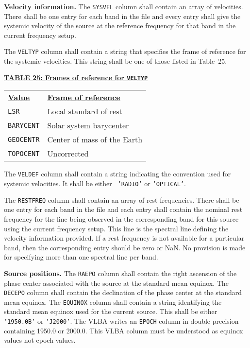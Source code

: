 \documentclass[twoside]{article}
\newcommand{\Hi}[1]{\textcolor{hicol}{#1}}
\newcommand{\Me}[1]{\textcolor{mecol}{#1}}
\begin{document}
{\bf Velocity information.}  The {\tt SYSVEL} column shall contain an
array of velocities.  There shall be one entry for each band in the
file and every entry shall give the systemic velocity of the source at
the reference frequency for that band in the current frequency
\Hi{setup}.

The {\tt VELTYP} column shall contain a string that specifies the
frame of reference for the systemic velocities.  This string shall be
one of those listed in Table~\Hi{25}.
\vfill\eject
\begin{center}
\underline{\bf{TABLE \Hi{25}: Frames of reference for {\tt VELTYP}}} \\
\begin{tabular}{ll}
\noalign{\vspace{2pt}}
\underline{{\bf Value\vphantom{y}}} & \underline{\bf{Frame of
    reference\vphantom{y}}} \\
\noalign{\vspace{2pt}}
{\tt LSR}        & Local standard of rest \\
{\tt BARYCENT}   & Solar system barycenter \\
{\tt GEOCENTR}   & Center of mass of the Earth \\
{\tt TOPOCENT}   & Uncorrected
\end{tabular}
\end{center}

The {\tt VELDEF} column shall contain a string indicating the
convention used for systemic velocities.  It shall be either {\tt
  'RADIO'} or {\tt 'OPTICAL'}\@.

The {\tt RESTFREQ} column shall contain an array of rest frequencies.
There shall be one entry for \Me{each} band in the file and each entry
shall contain the nominal rest frequency for the line being observed
in the corresponding band for this source using the current frequency
setup.  \Me{This line is the spectral line defining the velocity
information provided.}  If a rest frequency is not available for a
particular band, then the corresponding entry should be zero or NaN.
\Me{No provision is made for specifying more than one spectral line
  per band.}

{\bf Source positions.}  The {\tt RAEPO} column shall contain the
right ascension of the phase center associated with the source at
the standard mean \Hi{equinox}.  The {\tt DECEPO} column shall contain
the declination of the phase center at the standard mean \Hi{equinox}.
The {\tt EQUINOX} column shall contain a string identifying the
standard mean \Hi{equinox} used for the current source.  This shall be
either {\tt '1950.0B'} or {\tt 'J2000'}\@.  \Hi{The VLBA writes an
{\tt EPOCH} column in double precision containing 1950.0 or 2000.0.}
\Me{This VLBA column must be understood as equinox values not epoch
  values.}
\end{document}
